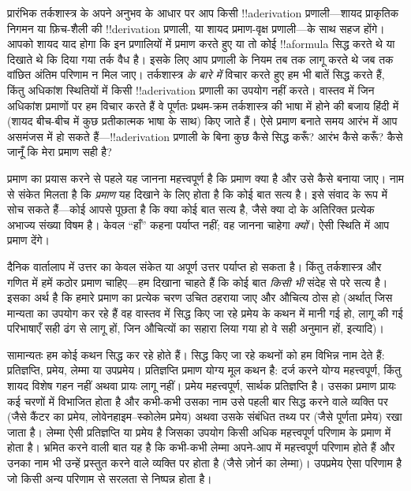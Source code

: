 \documentclass[../../../include/open-logic-section]{subfiles}
\begin{document}


प्रारंभिक तर्कशास्त्र के अपने अनुभव के आधार पर आप किसी !!a{derivation}
प्रणाली---शायद प्राकृतिक निगमन या फ़िच-शैली की !!{derivation} प्रणाली, या
शायद प्रमाण-वृक्ष प्रणाली---के साथ सहज होंगे। आपको शायद याद होगा कि इन
प्रणालियों में प्रमाण करते हुए या तो कोई !!a{formula} सिद्ध करते थे या
दिखाते थे कि दिया गया तर्क वैध है। इसके लिए आप प्रणाली के नियम तब तक लागू
करते थे जब तक वांछित अंतिम परिणाम न मिल जाए। तर्कशास्त्र \emph{के बारे में}
विचार करते हुए हम भी बातें सिद्ध करते हैं, किंतु अधिकांश स्थितियों में किसी
!!a{derivation} प्रणाली का उपयोग नहीं करते। वास्तव में जिन अधिकांश प्रमाणों
पर हम विचार करते हैं वे पूर्णतः प्रथम-क्रम तर्कशास्त्र की भाषा में होने की
बजाय हिंदी में (शायद बीच-बीच में कुछ प्रतीकात्मक भाषा के साथ) किए जाते हैं।
ऐसे प्रमाण बनाते समय आरंभ में आप असमंजस में हो सकते हैं---!!a{derivation}
प्रणाली के बिना कुछ कैसे सिद्ध करूँ? आरंभ कैसे करूँ? कैसे जानूँ कि मेरा
प्रमाण सही है?

प्रमाण का प्रयास करने से पहले यह जानना महत्त्वपूर्ण है कि प्रमाण क्या है और
उसे कैसे बनाया जाए। नाम से संकेत मिलता है कि \emph{प्रमाण} यह दिखाने के लिए
होता है कि कोई बात सत्य है। इसे संवाद के रूप में सोच सकते हैं---कोई आपसे
पूछता है कि क्या कोई बात सत्य है, जैसे क्या दो के अतिरिक्त प्रत्येक अभाज्य
संख्या विषम है। केवल ``हाँ'' कहना पर्याप्त नहीं; वह जानना चाहेगा
\emph{क्यों}। ऐसी स्थिति में आप प्रमाण देंगे।

दैनिक वार्तालाप में उत्तर का केवल संकेत या अपूर्ण उत्तर पर्याप्त हो सकता
है। किंतु तर्कशास्त्र और गणित में हमें कठोर प्रमाण चाहिए---हम दिखाना चाहते
हैं कि कोई बात \emph{किसी भी} संदेह से परे सत्य है। इसका अर्थ है कि हमारे
प्रमाण का प्रत्येक चरण उचित ठहराया जाए और औचित्य ठोस हो (अर्थात् जिस मान्यता
का उपयोग कर रहे हैं वह वास्तव में सिद्ध किए जा रहे प्रमेय के कथन में मानी
गई हो, लागू की गई परिभाषाएँ सही ढंग से लागू हों, जिन औचित्यों का सहारा लिया
गया हो वे सही अनुमान हों, इत्यादि)।

सामान्यतः हम कोई कथन सिद्ध कर रहे होते हैं। सिद्ध किए जा रहे कथनों को हम
विभिन्न नाम देते हैं: प्रतिज्ञप्ति, प्रमेय, लेम्मा या उपप्रमेय। प्रतिज्ञप्ति
प्रमाण योग्य मूल कथन है: दर्ज करने योग्य महत्त्वपूर्ण, किंतु शायद विशेष गहन
नहीं अथवा प्रायः लागू नहीं। प्रमेय महत्त्वपूर्ण, सार्थक प्रतिज्ञप्ति है।
उसका प्रमाण प्रायः कई चरणों में विभाजित होता है और कभी-कभी उसका नाम उसे
पहली बार सिद्ध करने वाले व्यक्ति पर (जैसे कैंटर का प्रमेय,
लोवेनहाइम--स्कोलेम प्रमेय) अथवा उसके संबंधित तथ्य पर (जैसे पूर्णता प्रमेय)
रखा जाता है। लेम्मा ऐसी प्रतिज्ञप्ति या प्रमेय है जिसका उपयोग किसी अधिक
महत्त्वपूर्ण परिणाम के प्रमाण में होता है। भ्रमित करने वाली बात यह है कि
कभी-कभी लेम्मा अपने-आप में महत्त्वपूर्ण परिणाम होते हैं और उनका नाम भी उन्हें
प्रस्तुत करने वाले व्यक्ति पर होता है (जैसे ज़ोर्न का लेम्मा)। उपप्रमेय ऐसा
परिणाम है जो किसी अन्य परिणाम से सरलता से निष्पन्न होता है।
\end{document}
